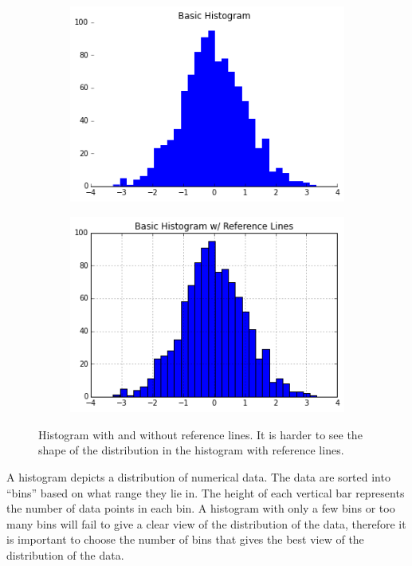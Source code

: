 \begin{figure}[H] %
\centering
\begin{subfigure}{.45\textwidth}
\centering
\includegraphics[width=\textwidth]{good_hist_example.png}
\end{subfigure}
\centering
\begin{subfigure}{.45\textwidth}
\centering
\includegraphics[width=\textwidth]{hist_reference_grid.png}
\end{subfigure}
\caption{Histogram with and without reference lines. It is harder to see the shape of the distribution in the histogram with reference lines.}
\label{fig:histogram}
\end{figure}

A histogram depicts a distribution of numerical data.
The data are sorted into ``bins'' based on what range they lie in.
The height of each vertical bar represents the number of data points in each bin.
A histogram with only a few bins or too many bins will fail to give a clear view of the distribution of the data, therefore it is important to choose the number of bins that gives the best view of the distribution of the data.

